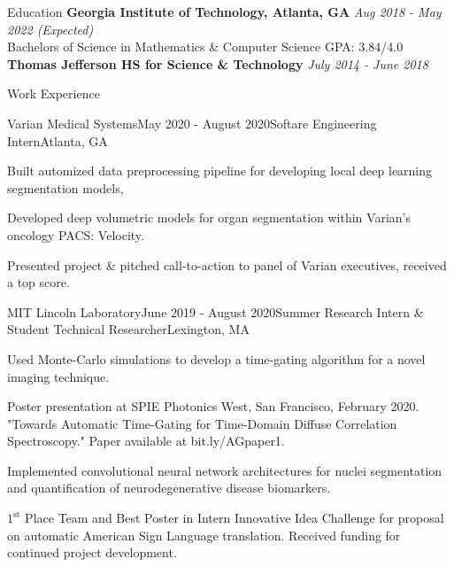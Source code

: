 \documentclass{template} %
\begin{document}

\begin{rSection}{Education}
{\bf Georgia Institute of Technology, Atlanta, GA} \hfill {\em Aug 2018 - May 2022 (Expected)}
\\ Bachelors of Science in Mathematics \& Computer Science \hfill  GPA: 3.84/4.0 \medskip
\\ {\bf Thomas Jefferson HS for Science \& Technology} \hfill {\em July 2014 - June 2018}
\end{rSection}


\begin{rSection}{Work Experience}

\begin{rSubsection}{Varian Medical Systems}{May 2020 - August 2020}{Softare Engineering Intern}{Atlanta, GA}
\item Built automized data preprocessing pipeline for developing local deep learning segmentation models,
\item Developed deep volumetric models for organ segmentation within Varian's oncology PACS: Velocity.
\item Presented project \& pitched call-to-action to panel of Varian executives, received a top score.
\end{rSubsection}

\begin{rSubsection}{MIT Lincoln Laboratory}{June 2019 - August 2020}{Summer Research Intern \& Student Technical Researcher}{Lexington, MA}
\item Used Monte-Carlo simulations to develop a time-gating algorithm for a novel imaging technique.
\item Poster presentation at SPIE Photonics West, San Francisco, February 2020. "Towards Automatic Time-Gating for Time-Domain Diffuse Correlation Spectroscopy." Paper available at bit.ly/AGpaper1.
\item Implemented convolutional neural network architectures for nuclei segmentation and quantification of neurodegenerative disease biomarkers.
\item$1^{\text{st}}$ Place Team and Best Poster in Intern Innovative Idea Challenge for proposal on automatic American Sign Language translation. Received funding for continued project development.
\end{rSubsection}

\end{rSection}
\vspace{-2mm}
\end{document}
